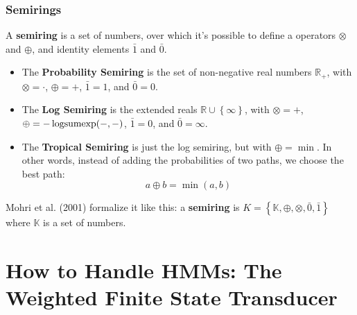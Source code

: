 \documentclass{beamer}
\newcommand{\logsumexp}{\operatornamewithlimits{logsumexp}}
\begin{document}
\begin{frame}
  \frametitle{Semirings}

  A {\bf semiring} is a set of numbers, over which it's possible to
  define a operators $\otimes$ and $\oplus$,
  and identity elements $\bar{1}$ and $\bar{0}$.
  \begin{itemize}
  \item The {\bf Probability Semiring} is the set of non-negative real
    numbers $\mathbb{R}_+$, with $\otimes=\cdot$, $\oplus=+$, $\bar{1}=1$, and $\bar{0}=0$.
  \item The {\bf Log Semiring} is the extended reals
    $\mathbb{R}\cup\left\{\infty\right\}$, with $\otimes=+$, $\oplus
    =-\logsumexp(-,-)$, $\bar{1}=0$, and $\bar{0}=\infty$.
  \item The {\bf Tropical Semiring} is just the log semiring, but with
    $\oplus=\min$.  In other words, instead of adding the
    probabilities of two paths, we choose the best path:
    \begin{displaymath}
      a\oplus b = \min(a,b)
    \end{displaymath}
  \end{itemize}
  Mohri et al. (2001) formalize it like this: a {\bf semiring} is
  $K=\left\{\mathbb{K},\oplus,\otimes,\bar{0},\bar{1}\right\}$ where
  $\mathbb{K}$ is a set of numbers.
\end{frame}

\section[WFSTs]{How to Handle HMMs: The Weighted Finite State Transducer}
\setcounter{subsection}{1}
\end{document}

